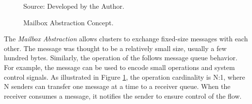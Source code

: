 				\begin{figure}[t]
					\centering
					\caption{Mailbox Abstraction Concept.}



					Source: Developed by the Author.
					\label{fig.conpt_mailbox}
				\end{figure}

				The \textit{Mailbox Abstraction} allows clusters to exchange fixed-size
				messages with each other.
				The message was thought to be a relatively small size, usually a few hundred bytes.
				Similarly, the operation of the \mailbox follows \posix message queue behavior.
				For example, the message can be used to encode small operations and system
				control signals.
				As illustrated in Figure \ref{fig.conpt_mailbox}, the operation cardinality is N:1,
				where N senders can transfer one message at a time to a receiver queue.
				When the receiver consumes a message, it notifies the sender to ensure
				control of the flow.

			\label{sec.portal-abs}

